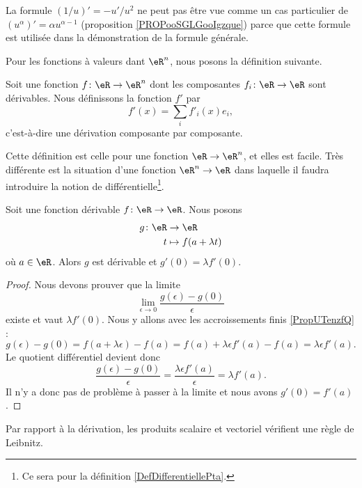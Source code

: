 \begin{remark}
	La formule \( (1/u)'=-u'/u^2\) ne peut pas être vue comme un cas particulier de \( (u^{\alpha})'=\alpha u^{\alpha-1}\) (proposition \ref{PROPooSGLGooIgzque}) parce que cette formule est utilisée dans la démonstration de la formule générale.
\end{remark}


Pour les fonctions à valeurs dant \( \eR^n\), nous posons la définition suivante.
\begin{definition}
	Soit une fonction \( f\colon \eR\to \eR^n\) dont les composantes \( f_i\colon \eR\to \eR\) sont dérivables. Nous définissons la fonction \( f'\) par
	\begin{equation}
		f'(x)=\sum_if'_i(x)e_i,
	\end{equation}
	c'est-à-dire une dérivation composante par composante.
\end{definition}

Cette définition est celle pour une fonction \( \eR\to \eR^n\), et elles est facile. Très différente est la situation d'une fonction \( \eR^n\to \eR\) dans laquelle il faudra introduire la notion de différentielle\footnote{Ce sera pour la définition \ref{DefDifferentiellePta}.}.

\begin{lemma}       \label{LEMooXHVBooHYjXdq}
	Soit une fonction dérivable \( f\colon \eR\to \eR\). Nous posons
	\begin{equation}
		\begin{aligned}
			g\colon \eR & \to \eR                \\
			t           & \mapsto f(a+\lambda t)
		\end{aligned}
	\end{equation}
	où \( a\in \eR\). Alors \( g\) est dérivable et \( g'(0)=\lambda  f'(0)\).
\end{lemma}

\begin{proof}
	Nous devons prouver que la limite
	\begin{equation}
		\lim_{\epsilon\to 0}\frac{ g(\epsilon)-g(0) }{ \epsilon }
	\end{equation}
	existe et vaut \( \lambda f'(0)\). Nous y allons avec les accroissements finis \ref{PropUTenzfQ} :
	\begin{equation}
		g(\epsilon)-g(0)=f(a+\lambda \epsilon)-f(a)=f(a)+\lambda \epsilon f'(a)-f(a)=\lambda\epsilon f'(a).
	\end{equation}
	Le quotient différentiel devient donc
	\begin{equation}
		\frac{ g(\epsilon)-g(0) }{ \epsilon }=\frac{ \lambda \epsilon f'(a) }{ \epsilon }=\lambda f'(a).
	\end{equation}
	Il n'y a donc pas de problème à passer à la limite et nous avons \( g'(0)=f'(a)\).
\end{proof}
Par rapport à la dérivation, les produits scalaire et vectoriel vérifient une règle de Leibnitz.

